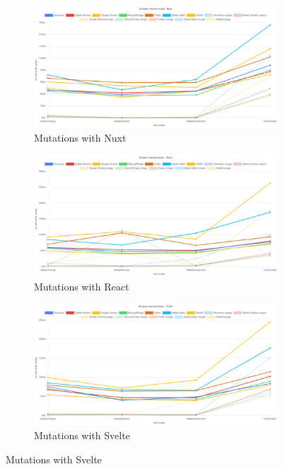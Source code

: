 \documentclass[a4paper, 10pt]{article}
\begin{document}
\begin{figure}[ht!]\ContinuedFloat
  \begin{subfigure}{0.9\linewidth}
    \begin{center}
      \includegraphics[width=\linewidth, keepaspectratio]{img/playwright-results/framework/NuxtAvg.png}
    \end{center}
    \caption{Mutations with Nuxt}\label{subfig:PW:NuxtAvg}
  \end{subfigure}
  \begin{subfigure}{0.9\linewidth}
    \begin{center}
      \includegraphics[width=\linewidth, keepaspectratio]{img/playwright-results/framework/ReactAvg.png}
    \end{center}
    \caption{Mutations with React}\label{subfig:PW:ReactAvg}
  \end{subfigure}
  \begin{subfigure}{0.9\linewidth}
    \begin{center}
      \includegraphics[width=\linewidth, keepaspectratio]{img/playwright-results/framework/SvelteAvg.png}
    \end{center}
    \caption{Mutations with Svelte}\label{subfig:PW:SvelteAvg}
  \end{subfigure}
\end{figure}
\end{document}
